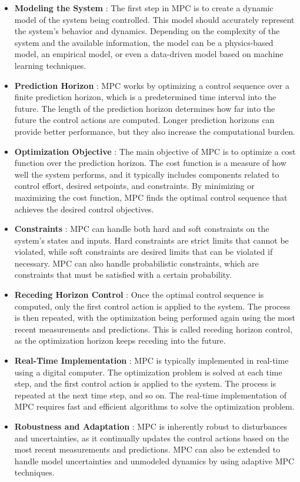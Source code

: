 \begin{itemize}
    \item \textbf{Modeling the System} : The first step in MPC is to create a dynamic model of the system being controlled. This model should accurately represent the system's behavior and dynamics. Depending on the complexity of the system and the available information, the model can be a physics-based model, an empirical model, or even a data-driven model based on machine learning techniques.
    \item \textbf{Prediction Horizon} : MPC works by optimizing a control sequence over a finite prediction horizon, which is a predetermined time interval into the future. The length of the prediction horizon determines how far into the future the control actions are computed. Longer prediction horizons can provide better performance, but they also increase the computational burden.
    \item \textbf{Optimization Objective} : The main objective of MPC is to optimize a cost function over the prediction horizon. The cost function is a measure of how well the system performs, and it typically includes components related to control effort, desired setpoints, and constraints. By minimizing or maximizing the cost function, MPC finds the optimal control sequence that achieves the desired control objectives.
    \item \textbf{Constraints} : MPC can handle both hard and soft constraints on the system's states and inputs. Hard constraints are strict limits that cannot be violated, while soft constraints are desired limits that can be violated if necessary. MPC can also handle probabilistic constraints, which are constraints that must be satisfied with a certain probability.
    \item \textbf{Receding Horizon Control} : Once the optimal control sequence is computed, only the first control action is applied to the system. The process is then repeated, with the optimization being performed again using the most recent measurements and predictions. This is called receding horizon control, as the optimization horizon keeps receding into the future.
    \item \textbf{Real-Time Implementation} : MPC is typically implemented in real-time using a digital computer. The optimization problem is solved at each time step, and the first control action is applied to the system. The process is repeated at the next time step, and so on. The real-time implementation of MPC requires fast and efficient algorithms to solve the optimization problem.
    \item \textbf{Robustness and Adaptation} : MPC is inherently robust to disturbances and uncertainties, as it continually updates the control actions based on the most recent measurements and predictions. MPC can also be extended to handle model uncertainties and unmodeled dynamics by using adaptive MPC techniques.
\end{itemize}

